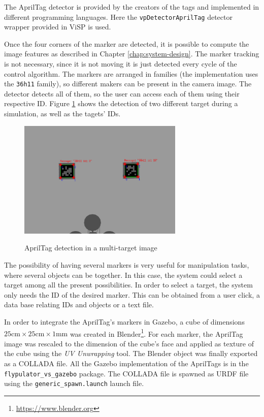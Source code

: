 The AprilTag detector is provided by the creators of the tags and implemented  in different programming languages. Here the \texttt{vpDetectorAprilTag} detector wrapper provided in ViSP is used. 


Once the four corners of the marker are detected, it is possible to compute the image features as described in Chapter \ref{chap:system-design}. The marker tracking is not necessary, since it is not moving it is just detected every cycle of the control algorithm. The markers are arranged in families (the implementation uses the \texttt{36h11} family), so different makers can be present in the camera image. The detector detects all of them, so the user can access each of them using their respective ID. Figure \ref{fig:apriltag-detection} shows the detection of two different target during a simulation, as well as the tagets' IDs.

\begin{figure}[!htb]
	\caption{AprilTag detection in a multi-target image}
	\centering
	\includegraphics[width=0.7\textwidth]{content/chapter_05/images/april-detection.png}
	\label{fig:apriltag-detection}
\end{figure}

The possibility of having several markers is very useful for manipulation tasks, where several objects can be together. In this case, the system could select a target among all the present possibilities. In order to select a target, the system only needs the ID of the desired marker. This can be obtained from a user click, a data base relating IDs and objects or a text file.

 In order to integrate the AprilTag's markers in Gazebo, a cube of dimensions $25\text{cm}\times25\text{cm}\times1\text{mm}$ was created in Blender\footnote{\url{https://www.blender.org}}. For each marker, the AprilTag image was rescaled to the dimension of the cube's face and applied as texture of the cube using the \emph{UV Unwrapping} tool. The Blender object was finally exported as a COLLADA file. All the Gazebo implementation of the AprilTags is in the \texttt{flypulator\_vs\_gazebo} package. The COLLADA file is spawned as URDF file using the \texttt{generic\_spawn.launch} launch file.

